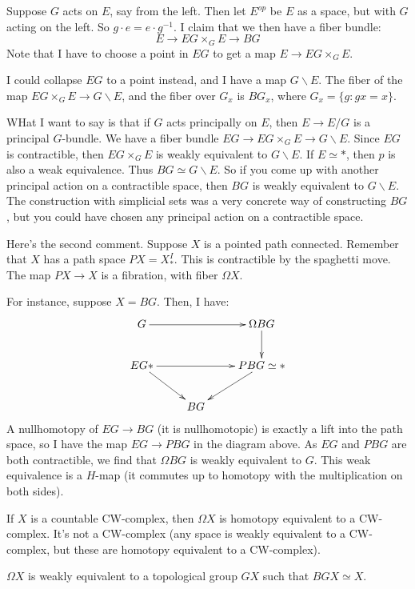 Suppose $G$ acts on $E$, say from the left.
Then let $E^{op}$ be $E$ as a space, but with $G$ acting on the left.
So $g\cdot e = e\cdot g^{-1}$.
I claim that we then have a fiber bundle:
\begin{equation*}
    E\to EG\times_G E\to BG
\end{equation*}
Note that I have to choose a point in $EG$ to get a map $E\to EG\times_G E$.

I could collapse $EG$ to a point instead, and I have a map $G\backslash E$.
The fiber of the map $EG\times_G E\to G\backslash E$, and the fiber over $G_x$ is $BG_x$, where $G_x = \{g: gx = x\}$.

WHat I want to say is that if $G$ acts principally on $E$, then $E\to E/G$ is a principal $G$-bundle.
We have a fiber bundle $EG\to EG\times_G E\to G\backslash E$.
Since $EG$ is contractible, then $EG\times_G E$ is weakly equivalent to $G\backslash E$.
If $E\simeq \ast$, then $p$ is also a weak equivalence.
Thus $BG\simeq G\backslash E$.
So if you come up with another principal action on a contractible space, then $BG$ is weakly equivalent to $G\backslash E$.
The construction with simplicial sets was a very concrete way of constructing $BG$, but you could have chosen any principal action on a contractible space.

Here's the second comment.
Suppose $X$ is a pointed path connected.
Remember that $X$ has a path space $PX = X^I_\ast$.
This is contractible by the spaghetti move.
The map $PX\to X$ is a fibration, with fiber $\Omega X$.

For instance, suppose $X = BG$.
Then, I have:
\begin{equation*}
    \xymatrix{
	G\ar[rr] & & \Omega BG\ar[d]\\
	EG\ast\ar[dr]\ar[rr] & & PBG\simeq \ast \ar[dl]\\
	& BG &
    }
\end{equation*}
A nullhomotopy of $EG\to BG$ (it is nullhomotopic) is exactly a lift into the path space, so I have the map $EG\to PBG$ in the diagram above.
As $EG$ and $PBG$ are both contractible, we find that $\Omega BG$ is weakly equivalent to $G$.
This weak equivalence is a $H$-map (it commutes up to homotopy with the multiplication on both sides).
\begin{remark}[Milnor]
    If $X$ is a countable CW-complex, then $\Omega X$ is homotopy equivalent to a CW-complex.
    It's not a CW-complex (any space is weakly equivalent to a CW-complex, but these are homotopy equivalent to a CW-complex).
\end{remark}
\begin{remark}
    $\Omega X$ is weakly equivalent to a topological group $GX$ such that $BGX\simeq X$.
\end{remark}
